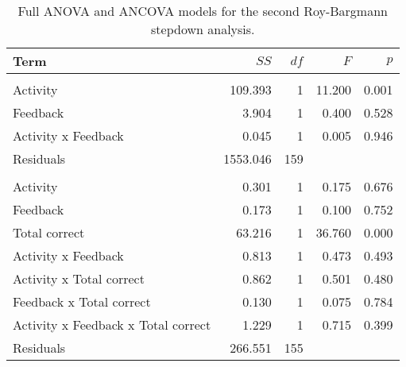 \documentclass[11pt,]{article}
\begin{document}
\begin{table*}[t]

\caption{\label{tab:rb2Table}Full ANOVA and ANCOVA models for the second Roy-Bargmann
                     stepdown analysis.}
\centering
\begin{tabular}{lrrrr}
\toprule
Term & $SS$ & $df$ & $F$ & $p$\\
\midrule
\addlinespace[0.3em]
\multicolumn{5}{l}{\textbf{ANOVA}}\\
\hspace{1em}Activity & 109.393 & 1 & 11.200 & 0.001\\
\hspace{1em}Feedback & 3.904 & 1 & 0.400 & 0.528\\
\hspace{1em}Activity x Feedback & 0.045 & 1 & 0.005 & 0.946\\
\hspace{1em}Residuals & 1553.046 & 159 &  & \\
\addlinespace[0.3em]
\multicolumn{5}{l}{\textbf{ANCOVA}}\\
\hspace{1em}Activity & 0.301 & 1 & 0.175 & 0.676\\
\hspace{1em}Feedback & 0.173 & 1 & 0.100 & 0.752\\
\hspace{1em}Total correct & 63.216 & 1 & 36.760 & 0.000\\
\hspace{1em}Activity x Feedback & 0.813 & 1 & 0.473 & 0.493\\
\hspace{1em}Activity x Total correct & 0.862 & 1 & 0.501 & 0.480\\
\hspace{1em}Feedback x Total correct & 0.130 & 1 & 0.075 & 0.784\\
\hspace{1em}Activity x Feedback x Total correct & 1.229 & 1 & 0.715 & 0.399\\
\hspace{1em}Residuals & 266.551 & 155 &  & \\
\bottomrule
\end{tabular}
\end{table*}

\onecolumn



\end{document}
